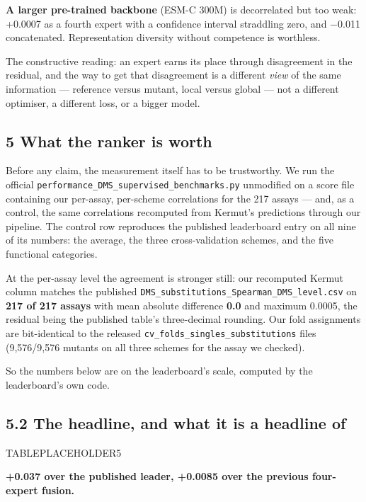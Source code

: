\textbf{A larger pre-trained backbone} (ESM-C 300M) is decorrelated but too weak: +0.0007 as a fourth expert
with a confidence interval straddling zero, and −0.011 concatenated. Representation diversity without
competence is worthless.

The constructive reading: an expert earns its place through disagreement in the residual, and the way
to get that disagreement is a different \emph{view} of the same information --- reference versus mutant, local
versus global --- not a different optimiser, a different loss, or a bigger model.

\hypertarget{what-the-ranker-is-worth}{%
\subsection{5 What the ranker is worth}\label{what-the-ranker-is-worth}}

Before any claim, the measurement itself has to be trustworthy. We run the official
\texttt{performance\_DMS\_supervised\_benchmarks.py} unmodified on a score file containing our per-assay,
per-scheme correlations for the 217 assays --- and, as a control, the same correlations recomputed from
Kermut's predictions through our pipeline. The control row reproduces the published leaderboard entry on
all nine of its numbers: the average, the three cross-validation schemes, and the five functional
categories.

At the per-assay level the agreement is stronger still: our recomputed Kermut column matches the
published \texttt{DMS\_substitutions\_Spearman\_DMS\_level.csv} on \textbf{217 of 217 assays} with mean absolute
difference \textbf{0.0} and maximum 0.0005, the residual being the published table's three-decimal rounding.
Our fold assignments are bit-identical to the released \texttt{cv\_folds\_singles\_substitutions} files
(9,576/9,576 mutants on all three schemes for the assay we checked).

So the numbers below are on the leaderboard's scale, computed by the leaderboard's own code.

\hypertarget{the-headline-and-what-it-is-a-headline-of}{%
\subsection{5.2 The headline, and what it is a headline of}\label{the-headline-and-what-it-is-a-headline-of}}

TABLEPLACEHOLDER5

\textbf{+0.037 over the published leader, +0.0085 over the previous four-expert fusion.}

